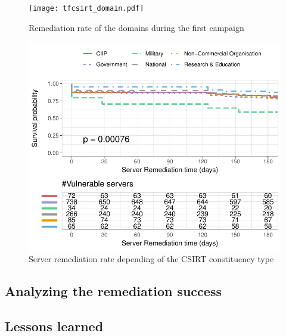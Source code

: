\begin{figure}[!hbt]
\centering
\texttt{[image: tfcsirt\_domain.pdf]}
\caption{Remediation rate of the domains during the first campaign }
\end{figure}
\begin{figure}[!hbt]
\centering
\includegraphics[width=.8\columnwidth]{figs/surv_tfcsirt-types.pdf}
\caption{Server remediation rate depending of the CSIRT constituency type }
\end{figure}


\subsection{Analyzing the remediation success}
\subsection{Lessons learned}
